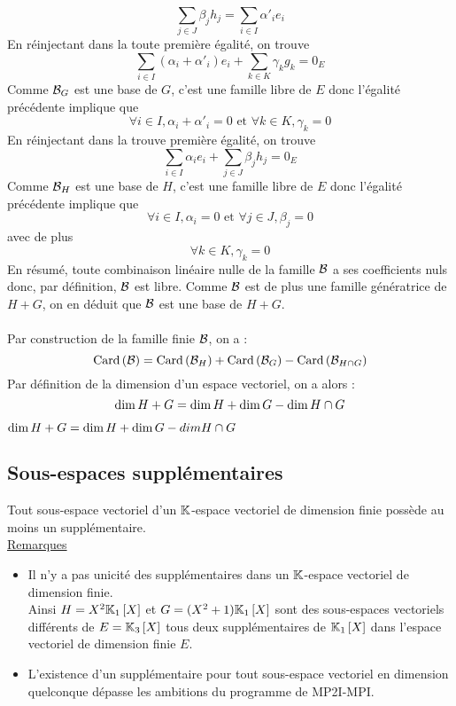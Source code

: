 \begin{dem}
\begin{itemize}
            \[\sum_{j\in J}\beta_j h_j = \sum_{i\in I}\alpha'_ie_i\]
            En réinjectant dans la toute première égalité, on trouve
            \[\sum_{i\in I}(\alpha_i + \alpha'_i)e_i + \sum_{k\in K}\gamma_kg_k = 0_E\]
            Comme \(\cal{B}_G\) est une base de \(G\), c’est une famille libre de \(E\) donc l’égalité précédente implique que
            \[\forall i \in I, \alpha_i + \alpha'_i = 0 \text{ et }\forall k \in K, \gamma_k = 0\]
            En réinjectant dans la trouve première égalité, on trouve 
            \[\sum_{i\in I}\alpha_ie_i + \sum_{j\in J}\beta_j h_j = 0_E\]
            Comme \(\cal{B}_H\) est une base de \(H\), c’est une famille libre de \(E\) donc l’égalité précédente implique que
            \[\forall i \in I, \alpha_i = 0\text{ et }\forall j \in J, \beta_j = 0\]
            avec de plus
            \[\forall k \in K, \gamma_k = 0\]
            En résumé, toute combinaison linéaire nulle de la famille \(\cal{B}\) a ses coefficients nuls donc, par définition, \(\cal{B}\) est libre. Comme \(\cal{B}\) est de plus une famille génératrice de \(H +G\), on en déduit que \(\cal{B}\) est une base de \(H +G\).\\~\\
            Par construction de la famille finie \(\cal{B}\), on a :
            \[\Card{\cal{B}} = \Card{\cal{B}_H} + \Card{\cal{B}_G} - \Card{\cal{B}_{H\inter G}}\]
            Par définition de la dimension d’un espace vectoriel, on a alors :
            \[\dim H + G = \dim H + \dim G - \dim H \inter G\]
    \end{itemize}
    \conclusion \(\dim H + G = \dim H + \dim G - dim H \inter G\)
\end{dem}

\subsection{Sous-espaces supplémentaires}

\begin{theo}
    Tout sous-espace vectoriel d’un \(\K\)-espace vectoriel de dimension finie possède au moins un supplémentaire.\\
    \underline{Remarques}\\
    \begin{itemize}
        \item Il n’y a pas unicité des supplémentaires dans un \(\K\)-espace vectoriel de dimension finie.\\
        Ainsi \(H = X^2\K_1 \croch{X}\) et \(G = (X^2 + 1)\K_1 \croch{X}\) sont des sous-espaces vectoriels différents de \(E = \K_3 \croch{X}\) tous deux supplémentaires de \(\K_1 \croch{X}\) dans l’espace vectoriel de dimension finie \(E\).
        \item L’existence d’un supplémentaire pour tout sous-espace vectoriel en dimension quelconque dépasse les ambitions du programme de MP2I-MPI.
    \end{itemize}
\end{theo}

